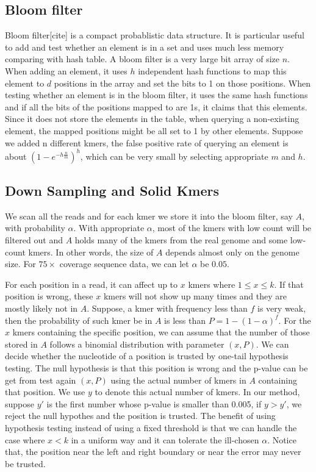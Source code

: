 \documentclass[10pt]{article}
\begin{document}
\subsection*{Bloom filter}
Bloom filter[cite] is a compact probablistic data structure. It is particular useful to add and test whether an element is in a set and uses much less memory comparing with hash table. A bloom filter is a very large bit array of size $n$. When adding an element, it uses $h$ independent hash functions to map this element to $d$ positions in the array and set the bits to 1 on those positions. When testing whether an element is in the bloom filter, it uses the same hash functions and if all the bits of the positions mapped to are 1s, it claims that this elements. Since it does not store the elements in the table, when querying a non-existing element, the mapped positions might be all set to 1 by other elements. Suppose we added n different kmers, the false positive rate of querying an element is about $(1-e^{-h\frac{n}{m}})^h$, which can be very small by selecting appropriate $m$ and $h$. 

\subsection*{Down Sampling and Solid Kmers}
We scan all the reads and for each kmer we store it into the bloom filter, say $A$, with probability $\alpha$. With appropriate $\alpha$, most of the kmers with low count will be filtered out and $A$ holds many of the kmers from the real genome and some low-count kmers.  In other words, the size of $A$ depends almost only on the genome size. For $75\times$ coverage sequence data, we can let $\alpha$ be $0.05$.

For each position in a read, it can affect up to $x$ kmers where $1\le x\le k$. If that position is wrong, these $x$ kmers will not show up many times and they are mostly likely not in $A$. Suppose, a kmer with frequency less than $f$ is very weak, then the probability of such kmer be in $A$ is less than $P=1-(1-\alpha)^f$. For the $x$ kmers containing the specific position, we can assume that the number of those stored in $A$ follows a binomial distribution with parameter $(x,P)$. We can decide whether the nucleotide of a position is trusted by one-tail hypothesis testing. The null hypothesis is that this position is wrong and the p-value can be get from test again $(x,P)$ using the actual number of kmers in $A$ containing that position. We use $y$ to denote this actual number of kmers. In our method, suppose $y'$ is the first number whose p-value is smaller than 0.005, if $y>y'$, we reject the null hypothes and the position is trusted. The benefit of using hypothesis testing instead of using a fixed threshold is that we can handle the case where $x<k$ in a uniform way and it can tolerate the ill-chosen $\alpha$. Notice that, the position near the left and right boundary or near the error may never be trusted.
\end{document}
